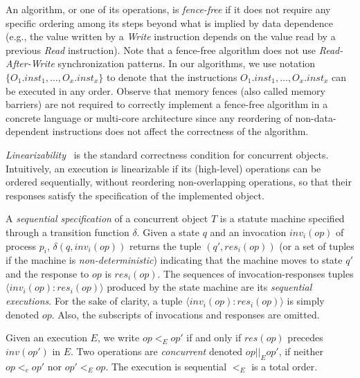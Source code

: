 An algorithm, or one of its operations, is \emph{fence-free} if it does not require any specific ordering among its steps beyond what is implied by data dependence (e.g., the value written by a \emph{Write} instruction depends on the value read by a previous \emph{Read} instruction). Note that a fence-free algorithm does not use \emph{Read-After-Write} synchronization patterns. In our algorithms, we use notation \(\{O_1.inst_1, \ldots, O_x.inst_x\}\) to denote that the instructions \(O_1.inst_1, \ldots, O_x.inst_x\) can be executed in any order. Observe that memory fences (also called memory barriers) are not required to correctly implement a fence-free algorithm in a concrete language or multi-core architecture since any reordering of non-data-dependent instructions does not affect the correctness of the algorithm.

\emph{Linearizability}~\cite{DBLP_journals_toplas_HerlihyW90} is the standard correctness condition for concurrent objects. Intuitively, an execution is linearizable if its (high-level) operations can be ordered sequentially, without reordering non-overlapping operations, so that their responses satisfy the specification of the implemented object.

A \emph{sequential specification} of a concurrent object \(T\) is a statute machine specified through a transition function \(\delta\). Given a state \(q\) and an invocation \(inv_i(op)\) of process \(p_i\), \(\delta(q, inv_i(op))\) returns the tuple \((q', res_i(op))\) (or a set of tuples if the machine is \emph{non-deterministic}) indicating that the machine moves to state \(q'\) and the response to \(op\) is \(res_i(op)\). The sequences of invocation-responses tuples \(\langle inv_i(op): res_i(op)\rangle\) produced by the state machine are its \emph{sequential executions}. For the sake of clarity, a tuple \(\langle inv_i(op): res_i(op)\rangle\) is simply denoted \(op\). Also, the subscripts of invocations and responses are omitted.

Given an execution \(E\), we write \(op <_E op'\) if and only if \(res(op)\) precedes \(inv(op')\) in \(E\). Two operations are \emph{concurrent} denoted \(op||_E op' \), if neither \(op <_e op'\) nor \(op' <_E op\). The execution is sequential \(<_E\) is a total order.


